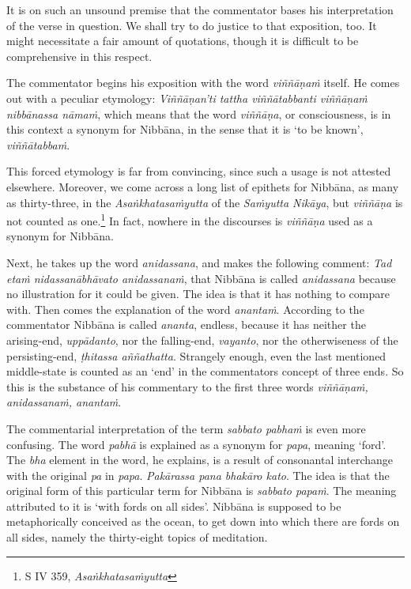It is on such an unsound premise that the commentator bases his interpretation of the verse in question. We shall try to do justice to that exposition, too. It might necessitate a fair amount of quotations, though it is difficult to be comprehensive in this respect.

The commentator begins his exposition with the word \emph{viññāṇaṁ} itself. He comes out with a peculiar etymology: \emph{Viññāṇan'ti tattha viññātabbanti viññāṇaṁ nibbānassa nāmaṁ}, which means that the word \emph{viññāṇa}, or consciousness, is in this context a synonym for Nibbāna, in the sense that it is `to be known', \emph{viññātabbaṁ}.

This forced etymology is far from convincing, since such a usage is not attested elsewhere. Moreover, we come across a long list of epithets for Nibbāna, as many as thirty-three, in the \emph{Asaṅkhatasaṁyutta} of the \emph{Saṁyutta Nikāya}, but \emph{viññāṇa} is not counted as one.\footnote{S IV 359, \emph{Asaṅkhatasaṁyutta}} In fact, nowhere in the discourses is \emph{viññāṇa} used as a synonym for Nibbāna.

Next, he takes up the word \emph{anidassana}, and makes the following comment: \emph{Tad etaṁ nidassanābhāvato anidassanaṁ}, that Nibbāna is called \emph{anidassana} because no illustration for it could be given. The idea is that it has nothing to compare with. Then comes the explanation of the word \emph{anantaṁ}. According to the commentator Nibbāna is called \emph{ananta}, endless, because it has neither the arising-end, \emph{uppādanto}, nor the falling-end, \emph{vayanto}, nor the otherwiseness of the persisting-end, \emph{ṭhitassa aññathatta}. Strangely enough, even the last mentioned middle-state is counted as an `end' in the commentators concept of three ends. So this is the substance of his commentary to the first three words \emph{viññāṇaṁ, anidassanaṁ, anantaṁ}.

The commentarial interpretation of the term \emph{sabbato pabhaṁ} is even more confusing. The word \emph{pabhā} is explained as a synonym for \emph{papa}, meaning `ford'. The \emph{bha} element in the word, he explains, is a result of consonantal interchange with the original \emph{pa} in \emph{papa}. \emph{Pakārassa pana bhakāro kato}. The idea is that the original form of this particular term for Nibbāna is \emph{sabbato papaṁ}. The meaning attributed to it is `with fords on all sides'. Nibbāna is supposed to be metaphorically conceived as the ocean, to get down into which there are fords on all sides, namely the thirty-eight topics of meditation.

